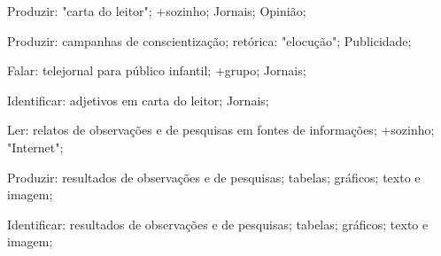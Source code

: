  Produzir: "carta do leitor"; +sozinho; Jornais; Opinião;

 Produzir: campanhas de conscientização; retórica: "elocução"; Publicidade;

 Falar: telejornal para público infantil; +grupo; Jornais;

 Identificar: adjetivos em carta do leitor; Jornais;

 Ler: relatos de observações e de pesquisas em fontes de informações; +sozinho; "Internet";

 Produzir: resultados de observações e de pesquisas; tabelas; gráficos; texto e imagem;

 Identificar: resultados de observações e de pesquisas; tabelas; gráficos; texto e imagem;

